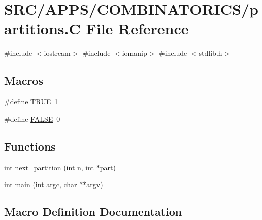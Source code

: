 \hypertarget{partitions_8_c}{}\section{S\+R\+C/\+A\+P\+P\+S/\+C\+O\+M\+B\+I\+N\+A\+T\+O\+R\+I\+C\+S/partitions.C File Reference}
\label{partitions_8_c}
{\ttfamily \#include $<$iostream$>$}\newline
{\ttfamily \#include $<$iomanip$>$}\newline
{\ttfamily \#include $<$stdlib.\+h$>$}\newline
\subsection*{Macros}
\begin{DoxyCompactItemize}
\item 
\#define \mbox{\hyperlink{partitions_8_c_aa8cecfc5c5c054d2875c03e77b7be15d}{T\+R\+UE}}~1
\item 
\#define \mbox{\hyperlink{partitions_8_c_aa93f0eb578d23995850d61f7d61c55c1}{F\+A\+L\+SE}}~0
\end{DoxyCompactItemize}
\subsection*{Functions}
\begin{DoxyCompactItemize}
\item 
int \mbox{\hyperlink{partitions_8_c_a50a4e984fdb21bd4b89ab9f37bfde7cf}{next\+\_\+partition}} (int \mbox{\hyperlink{simeon_8_c_a7f2cd26777ce0ff3fdaf8d02aacbddfb}{n}}, int $\ast$\mbox{\hyperlink{tdo__refine__all_8_c_af32a7ef139fc39ca4f560f3a90a83b89}{part}})
\item 
int \mbox{\hyperlink{partitions_8_c_a3c04138a5bfe5d72780bb7e82a18e627}{main}} (int argc, char $\ast$$\ast$argv)
\end{DoxyCompactItemize}


\subsection{Macro Definition Documentation}
\mbox{\label{partitions_8_c_aa93f0eb578d23995850d61f7d61c55c1}} 
